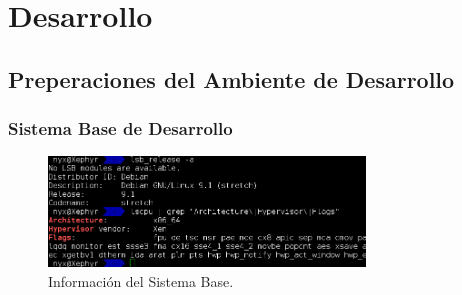 
\chapter{Desarrollo}
\label{capitulo4}

\section{Preperaciones del Ambiente de Desarrollo}

\subsection{Sistema Base de Desarrollo}

\begin{figure}
	\begin{center}
    	\includegraphics[width=0.75\textwidth]{Figures/sistema-base.png}
    \end{center}
  	\caption{Información del Sistema Base.}
    \label{sistema-base}
\end{figure}

